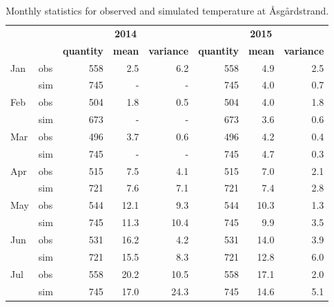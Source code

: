 \begin{table}
	\caption{\small Monthly statistics for observed and simulated temperature at \AA sg\aa rdstrand.}
	\label{tab:temp}
	\centering
	\begin{tabular}{|ll|rrr|rrr|}
\hline 
&& \multicolumn{3}{|c|}{\bf \small 2014} & \multicolumn{3}{|c|}{\bf \small 2015} \\
&& {\bf \small quantity} & {\bf \small mean} & {\bf \small variance}  
& {\bf \small quantity} & {\bf \small mean} & {\bf \small variance} \\ \hline 
\small Jan & \small obs & \small 558 & \small  2.5 & \small  6.2 & \small 558 & \small  4.9 & \small 2.5 \\
\small     & \small sim & \small 745 & \small  -   & \small    - & \small 745 & \small  4.0 & \small 0.7 \\
\small Feb & \small obs & \small 504 & \small  1.8 & \small  0.5 & \small 504 & \small  4.0 & \small 1.8 \\
\small     & \small sim & \small 673 & \small  -   & \small    - & \small 673 & \small  3.6 & \small 0.6 \\
\small Mar & \small obs & \small 496 & \small  3.7 & \small  0.6 & \small 496 & \small  4.2 & \small 0.4 \\
\small     & \small sim & \small 745 & \small  -   & \small    - & \small 745 & \small  4.7 & \small 0.3 \\
\small Apr & \small obs & \small 515 & \small  7.5 & \small  4.1 & \small 515 & \small  7.0 & \small 2.1 \\
\small     & \small sim & \small 721 & \small  7.6 & \small  7.1 & \small 721 & \small  7.4 & \small 2.8 \\
\small May & \small obs & \small 544 & \small 12.1 & \small  9.3 & \small 544 & \small 10.3 & \small 1.3 \\
\small     & \small sim & \small 745 & \small 11.3 & \small 10.4 & \small 745 & \small  9.9 & \small 3.5 \\
\small Jun & \small obs & \small 531 & \small 16.2 & \small  4.2 & \small 531 & \small 14.0 & \small 3.9 \\
\small     & \small sim & \small 721 & \small 15.5 & \small  8.3 & \small 721 & \small 12.8 & \small 6.0 \\
\small Jul & \small obs & \small 558 & \small 20.2 & \small 10.5 & \small 558 & \small 17.1 & \small 2.0 \\
\small     & \small sim & \small 745 & \small 17.0 & \small 24.3 & \small 745 & \small 14.6 & \small 5.1 \\

\end{tabular}
\end{table}
